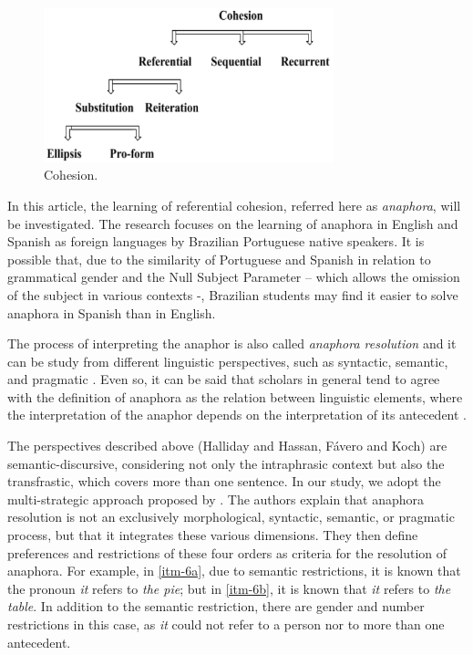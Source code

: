 \documentclass{textolivre}
\begin{document}
% 
%
\begin{figure}[htbp]
 \centering
 \includegraphics[width=0.75\textwidth]{fig02.png}
 \caption{Cohesion.}
 \label{fig02}
\end{figure}




In this article, the learning of referential cohesion, referred here as
\emph{anaphora}, will be investigated. The research focuses on the
learning of anaphora in English and Spanish as foreign languages by
Brazilian Portuguese native speakers. It is possible that, due to the
similarity of Portuguese and Spanish in relation to grammatical gender
and the Null Subject Parameter \cite{chomsky_lectures_1981,rizzi_issues_1982} -- which
allows the omission of the subject in various contexts -, Brazilian
students may find it easier to solve anaphora in Spanish than in
English.

The process of interpreting the anaphor is also called \emph{anaphora
resolution} \cite{hirst_anaphora_1981,mcdonald_time_1995,mitkov_oxford_2005} 
and it can be study from different linguistic perspectives, such as
syntactic, semantic, and pragmatic \cite{ariel_interpreting_1994,arnold_effect_2001,grosz_centering:_1995,rahman_coreference_2011}.
Even so, it can be said 
that scholars in general tend to agree with the definition of anaphora
as the relation between linguistic elements, where the interpretation of
the anaphor depends on the interpretation of its antecedent \cite[p.~1]{huang_anaphora:_2000}.

The perspectives described above (Halliday and Hassan, Fávero and Koch)
are semantic-discursive, considering not only the intraphrasic context
but also the transfrastic, which covers more than one sentence. In our
study, we adopt the multi-strategic approach proposed by \textcite{carbonell_anaphora_1988}.
The authors explain that anaphora resolution is not an
exclusively morphological, syntactic, semantic, or pragmatic process,
but that it integrates these various dimensions. They then define
preferences and restrictions of these four orders as criteria for the
resolution of anaphora. For example, in \ref{itm-6a}, due to semantic
restrictions, it is known that the pronoun \emph{it} refers to \emph{the
pie}; but in \ref{itm-6b}, it is known that \emph{it} refers to \emph{the
table}. In addition to the semantic restriction, there are gender and
number restrictions in this case, as \emph{it} could not refer to a
person nor to more than one antecedent.
\end{document}
